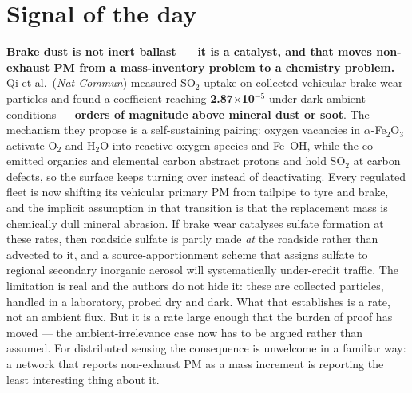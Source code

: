 \documentclass[10pt]{article}
\begin{document}
\vspace{6mm}

\section*{\sffamily\bfseries\color{Deep}Signal of the day}
\vspace{-1.5mm}{\color{Amber}\rule{\linewidth}{1.1pt}}\vspace{2.5mm}

\begin{keybox}
{\sffamily\bfseries\small\color{Deep}Brake dust is not inert ballast --- it is a catalyst,
and that moves non-exhaust PM from a mass-inventory problem to a chemistry problem.}\\[1.4mm]
\footnotesize
Qi et al.\ (\textit{Nat Commun}) measured SO$_2$ uptake on collected vehicular brake wear
particles and found a coefficient reaching \textbf{2.87$\times$10$^{-5}$} under dark
ambient conditions --- \textbf{orders of magnitude above mineral dust or soot}. The
mechanism they propose is a self-sustaining pairing: oxygen vacancies in
$\alpha$-Fe$_2$O$_3$ activate O$_2$ and H$_2$O into reactive oxygen species and Fe--OH,
while the co-emitted organics and elemental carbon abstract protons and hold SO$_2$ at
carbon defects, so the surface keeps turning over instead of deactivating. Every regulated
fleet is now shifting its vehicular primary PM from tailpipe to tyre and brake, and the
implicit assumption in that transition is that the replacement mass is chemically dull
mineral abrasion. If brake wear catalyses sulfate formation at these rates, then roadside
sulfate is partly made \emph{at} the roadside rather than advected to it, and a
source-apportionment scheme that assigns sulfate to regional secondary inorganic aerosol
will systematically under-credit traffic. The limitation is real and the authors do not
hide it: these are collected particles, handled in a laboratory, probed dry and dark. What
that establishes is a rate, not an ambient flux. But it is a rate large enough that the
burden of proof has moved --- the ambient-irrelevance case now has to be argued rather
than assumed. For distributed sensing the consequence is unwelcome in a familiar way: a
network that reports non-exhaust PM as a mass increment is reporting the least interesting
thing about it.
\end{keybox}

\vspace{3mm}
\end{document}
